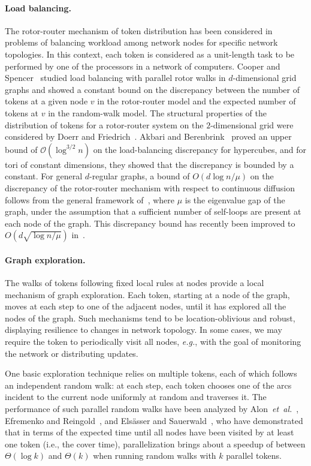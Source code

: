 \documentclass{article}[11pt,letter]
\newcommand{\bigo}{\mathcal{O}}
\newcommand{\eg}{{\it e.g.}\xspace}
\newcommand{\etal}{{\it et~al.}}
\begin{document}
\paragraph{Load balancing.}
The rotor-router mechanism of token distribution has been considered in problems of balancing workload among network nodes for specific network topologies. In this context, each token is considered as a unit-length task to be performed by one of the processors in a network of computers. Cooper and Spencer~\cite{DBLP:journals/cpc/CooperS06} studied load balancing with parallel rotor walks in $d$-dimensional grid graphs and showed a constant bound on the discrepancy between the number of tokens at a given node $v$ in the rotor-router model and the expected number of tokens at $v$ in the random-walk model. The structural properties of the distribution of tokens for a rotor-router system on the $2$-dimensional grid were considered by Doerr and Friedrich~\cite{DBLP:journals/cpc/DoerrF09}. Akbari and Berenbrink~\cite{DBLP:conf/spaa/AkbariB13} proved an upper bound of $\bigo(\log^{3/2} n)$ on the load-balancing discrepancy for hypercubes, and for tori of constant dimensions, they showed that the discrepancy is bounded by a constant. For general $d$-regular graphs, a bound of $O(d\log n /\mu)$ on the discrepancy of the rotor-router mechanism with respect to continuous diffusion follows from the general framework of~\cite{RSW98}, where $\mu$ is the eigenvalue gap of the graph, under the assumption that a sufficient number of self-loops are present at each node of the graph. This discrepancy bound has recently been improved to $O(d\sqrt{\log n /\mu})$ in~\cite{DBLP:journals/corr/BerenbrinkKKMU14}.

\paragraph{Graph exploration.}
The walks of tokens following fixed local rules at nodes provide a local mechanism of graph exploration. Each token, starting at a node of the graph, moves at each step to one of the adjacent nodes, until it has explored all the nodes of the graph. Such mechanisms tend to be location-oblivious and robust, displaying resilience to changes in network topology. In some cases, we may require the token to periodically visit all nodes, \eg, with the goal of monitoring the network or distributing updates.

One basic exploration technique relies on multiple tokens, each of which follows an independent random walk: at each step, each token chooses one of the arcs incident to the current node uniformly at random and traverses it. The performance of such parallel random walks have been analyzed by Alon~\etal~\cite{A08}, Efremenko and Reingold~\cite{DBLP:conf/approx/EfremenkoR09}, and Els\"asser and Sauerwald~\cite{DBLP:journals/tcs/ElsasserS11}, who have demonstrated that in terms of the expected time until all nodes have been visited by at least one token (i.e., the cover time), parallelization brings about a speedup of between $\Theta(\log k)$ and $\Theta(k)$ when running random walks with $k$ parallel tokens.
\end{document}
